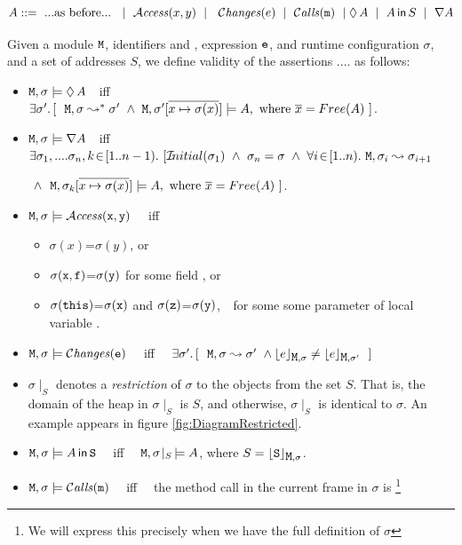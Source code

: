 \begin{definition}[Assertions]
$$\A ::=\  ... \mbox{as before} ...\ \ \mid \ \CanAccess x y \ \mid\  \ \Changes e \ \mid\  \Calls{m} \ \mid\  \\ \Future \A \ \mid \ \Using \A S  \ \mid \  \Past \A$$
\end{definition}



\begin{definition}
\label{def:permission}
Given a module ${\mbox{\tt{M}}}$, identifiers  and , expression ${{\mbox{\tt{e}}}}$, and runtime configuration $\sigma$, and a set of addresses $S$,
we define validity of the assertions   .... as follows:

\begin{itemize}
\item
${{\mbox{\tt{M}}}{{{\mbox{\tt{}}}}}},\sigma \models  \lozenge\, A$\ \ iff\ \  $\exists \sigma'.\, [\ \ \M,\sigma \leadsto^* \sigma' \ \wedge \ \M,\sigma' [\overline{x \mapsto \sigma(x)}]\models \A, \mbox{ where } \overline{x}=Free(\A)\   ]$.
\item
${{\mbox{\tt{M}}}{{{\mbox{\tt{}}}}}},\sigma \models  \nabla A$\ \   iff\ \  $\exists \sigma_1,....\sigma_n, k\!\in\![1..n-1).\ [ \Initial {\sigma_1}\  \wedge\ \sigma_n=\sigma\ \wedge\ \forall i\!\in\![1..n).\ \M,\sigma_i\leadsto  \sigma_{i+1}  $\\
\strut \hspace{5.7cm} $\ \wedge \  \ {\mbox{\tt{M}}},\sigma_k[\overline{x \mapsto \sigma(x)}]\models A, \mbox{ where } \overline{x}=Free(A)\  ]$.
\item
${{\mbox{\tt{M}}}{{{\mbox{\tt{}}}}}},\sigma \models   {\mathcal{A}}\textrm{\textit{ccess}}({\mbox{\tt{x}}},{\mbox{\tt{y}}})$   \ \ iff  \begin{itemize}
\item
$\sigma(x)$=$\sigma(y)$, or
\item
$\sigma({\mbox{\tt{x}}},{\mbox{\tt{f}}})$=$\sigma({\mbox{\tt{y}}})$  for some field ,  or
\item
$\sigma({\mbox{\tt{this}}})$=$\sigma({\mbox{\tt{x}}})$ and
  $\sigma({\mbox{\tt{z}}})$=$\sigma({\mbox{\tt{y}}})$,
  $\strut \hspace{0.1cm}$
for some some parameter of local variable .
 \end{itemize}
 \item
 ${{\mbox{\tt{M}}}{{{\mbox{\tt{}}}}}},\sigma \models   \mathcal{C}\textrm{\textit{hanges}}({\mbox{\tt{e}}})$   \ \ iff \  \
 $\exists \sigma'.\, [\ \ \M,\sigma \leadsto \sigma' \ \wedge \interp{e}{\M,\sigma} \neq \interp{e}{\M,\sigma'}\ \ ]$


\item
 $\sigma\!\mid_S$ denotes a {\em restriction} of $\sigma$ to the objects from the set $S$. That is, the domain of
 the heap in $\sigma\mid_S$ is $S$, and otherwise,  $\sigma\mid_S$ is identical to $\sigma$. An example appears in figure \ref{fig:DiagramRestricted}.
 \item
${\mbox{\tt{M}}},\sigma  \models A\,{\bf{\sf {in}}}\, {\mbox{\tt{S}}}$  \  \ iff \ \
  $ {\mbox{\tt{M}}},\sigma\!\mid_S\, \models A $, where   $S={\lfloor{ {{\mbox{\tt{S}}}}}\rfloor_{{\mbox{\tt{M}}},\sigma}} $.
 \item
 ${\mbox{\tt{M}}},\sigma  \models {\mathcal{C}}\textrm{\textit{alls}}({\mbox{\tt{m}}})$ \ \ iff \ \ the method call in the current frame in $\sigma$ is
 \footnote{We will express this precisely  when we have the full definition of $\sigma$}
\end{itemize}
\end{definition}


